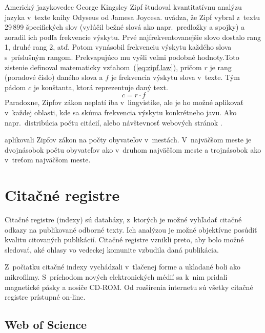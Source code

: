 Americký jazykovedec George Kingsley Zipf študoval kvantitatívnu analýzu jazyka
v~texte knihy Odyseus od Jamesa Joycesa.  \citet{Powers1998} uvádza, že Zipf
vybral z~textu 29\,899 špecifických slov (vylúčil bežné slová ako
napr.~predložky a spojky) a zoradil ich podľa frekvencie výskytu.  Prvé
najfrekventovanejšie slovo dostalo rang 1, druhé rang 2, atď.  Potom vynásobil
frekvenciu výskytu každého slova s~príslušným rangom.  Prekvapujúco mu vyšli
veľmi podobné hodnoty.Toto zistenie definoval matematicky
vzťahom~(\ref{eq:zipf.law}), pričom $r$ je rang (poradové číslo) daného slova a
$f$ je frekvencia výskytu slova v~texte.  Tým pádom $c$ je konštanta, ktorá
reprezentuje daný text.
\begin{equation}
\label{eq:zipf.law}
c = r \cdot f
\end{equation}
Paradoxne, Zipfov zákon neplatí iba v~lingvistike, ale je ho možné aplikovať
v~každej oblasti, kde sa skúma frekvencia výskytu konkrétneho javu.  Ako
napr.~distribúcia počtu citácií, alebo návštevnosť webových stránok
\citep{Li2002}.

\citet{Jiang2014} aplikovali Zipfov zákon na počty obyvateľov v~mestách.
V~najväčšom meste je dvojnásobok počtu obyvateľov ako v~druhom najväčšom meste a
trojnásobok ako v~treťom najväčšom meste.



\section{Citačné registre}

Citačné registre (indexy) sú databázy, z~ktorých je možné vyhľadať citačné
odkazy na publikované odborné texty.  Ich analýzou je možné objektívne posúdiť
kvalitu citovaných publikácií.  Citačné registre vznikli preto, aby bolo možné
sledovať, aké ohlasy vo vedeckej komunite vzbudila daná publikácia.

Z~počiatku citačné indexy vychádzali v~tlačenej forme a ukladané boli ako
mikrofilmy.  S~príchodom nových elektronických médií sa k~nim pridali magnetické
pásky a nosiče CD-ROM.  Od rozšírenia internetu sú všetky citačné registre
prístupné on-line.


\subsection{Web of Science}
\label{sec:wos}

